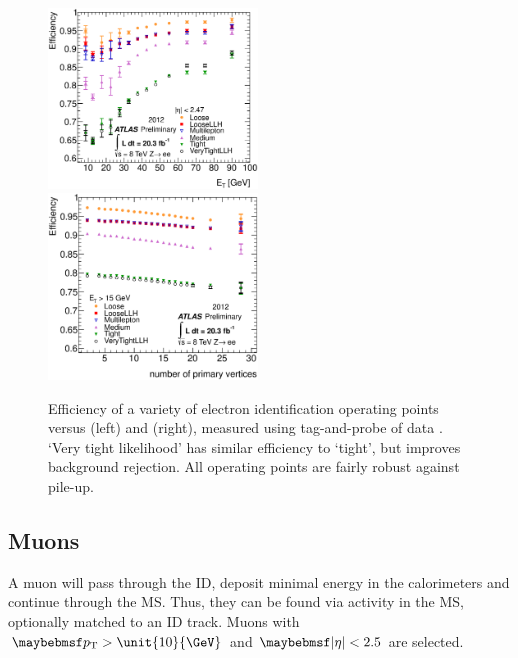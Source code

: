 \begin{description}
	\begin{figure}
		\includegraphics[width=0.495\textwidth]{tex/selection/el_ideff_et}
		\hfill
		\includegraphics[width=0.495\textwidth]{tex/selection/el_ideff_npv}
		\caption{Efficiency of a variety of electron identification operating points 
		versus \et (left) and \npv (right), measured using tag-and-probe of 
		\HepProcess{\PZ \HepTo \Pe\Pe} data \cite{ElectronPerf:2012}. `Very tight 
		likelihood' has similar efficiency to `tight', but improves background rejection. 
		All operating points are fairly robust against pile-up.}
		\label{fig:objects:el_ideff}
	\end{figure}

\end{description}



\subsection{Muons}
\label{sec:objects:muons}

A muon will pass through the \ac{ID}, deposit minimal energy in the calorimeters and 
continue through the \ac{MS}. Thus, they can be found via activity in the \ac{MS}, 
optionally matched to an \ac{ID} track. Muons with $\pt > \unit{10}{\GeV}$ and 
$\mods{\eta} < 2.5$ are selected.

